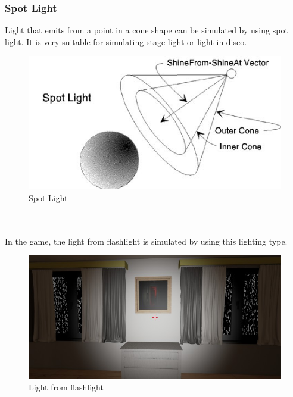 \documentclass{article}
\begin{document}
\subsubsection{Spot Light}
Light that emits from a point in a cone shape can be simulated by using spot light. It is very suitable for simulating stage light or light in disco. \\
\begin{figure}[hp!]
\centering
\includegraphics[scale=0.6]{spot_light.jpg}
\caption{Spot Light}
\label{fig:spot_light}
\end{figure}
 \\ \\
In the game, the light from flashlight is simulated by using this lighting type. \\
\begin{figure}[hp!]
\centering
\includegraphics[scale=0.6]{spotLight1.jpg}
\caption{Light from flashlight}
\label{fig:spot_light1}
\end{figure}
\clearpage
\end{document}
